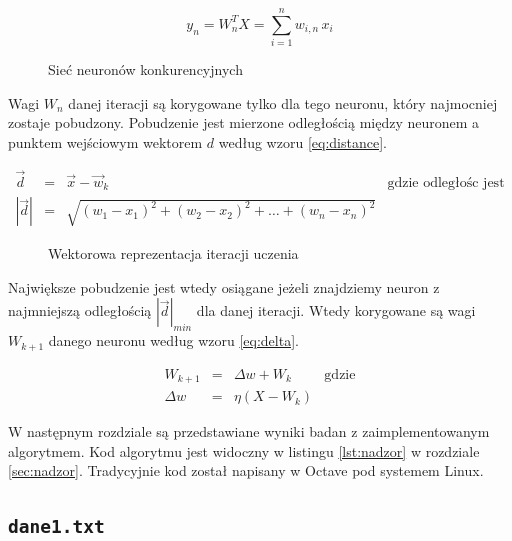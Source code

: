 \documentclass[pointlessnumbers, abstracton, headsepline, a4paper]{scrartcl}
\begin{document}
\begin{equation}
\label{eq:weights}
y_n = W^T_n X = \sum_{i=1}^{n} w_{i,n} \, x_i
\end{equation}

\begin{figure}[!h]
\centering

\caption{\label{fig:distance}Sieć neuronów konkurencyjnych}
\end{figure}

Wagi $W_n$ danej iteracji są korygowane tylko dla tego neuronu, który najmocniej zostaje pobudzony. Pobudzenie jest mierzone odległością między neuronem a punktem wejściowym wektorem $d$ według wzoru \ref{eq:distance}.

\begin{equation}
\label{eq:distance}
\begin{array}{rclc}
\vec d & = & \vec x-\vec w_k & \textrm{gdzie odległośc jest} \\
|\vec d| & = & \sqrt{(w_1-x_1)^2+(w_2-x_2)^2+\ldots+(w_n-x_n)^2} &
\end{array}
\end{equation}

\begin{figure}[!h]
\centering

\caption{\label{fig:distance}Wektorowa reprezentacja iteracji uczenia}
\end{figure}

Największe pobudzenie jest wtedy osiągane jeżeli znajdziemy neuron z najmniejszą odległością $|\vec d|_{min}$ dla danej iteracji. Wtedy korygowane są wagi $W_{k+1}$ danego neuronu według wzoru \ref{eq:delta}.

\begin{equation}
\label{eq:delta}
\begin{array}{rclc}
W_{k+1} & = & \Delta w + W_k & \textrm{gdzie} \\
\Delta w & = & \eta(X-W_k)
\end{array}
\end{equation}

W następnym rozdziale są przedstawiane wyniki badan z zaimplementowanym algorytmem. Kod algorytmu jest widoczny w listingu \ref{lst:nadzor} w rozdziale \ref{sec:nadzor}. Tradycyjnie kod został napisany w Octave pod systemem Linux.

\clearpage
\subsection{\texttt{dane1.txt}}
\end{document}
